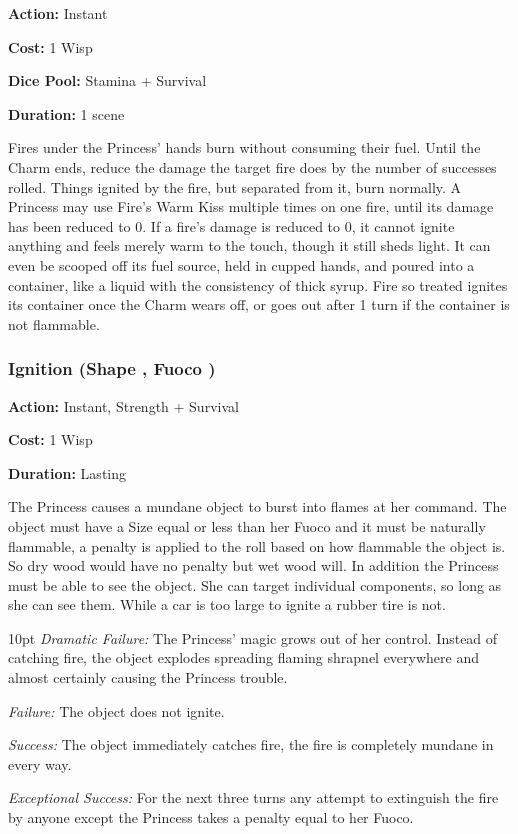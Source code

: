 \noindent \textbf{Action:} Instant

\noindent \textbf{Cost:} 1 Wisp

\noindent \textbf{Dice Pool:} Stamina + Survival

\noindent \textbf{Duration:} 1 scene

Fires under the Princess' hands burn without consuming their fuel. Until the Charm ends, reduce the damage the target fire does by the number of successes rolled. Things ignited by the fire, but separated from it, burn normally. A Princess may use Fire's Warm Kiss multiple times on one fire, until its damage has been reduced to 0. If a fire's damage is reduced to 0, it cannot ignite anything and feels merely warm to the touch, though it still sheds light. It can even be scooped off its fuel source, held in cupped hands, and poured into a container, like a liquid with the consistency of thick syrup. Fire so treated ignites its container once the Charm wears off, or goes out after 1 turn if the container is not flammable.

\subsubsection*{Ignition (Shape \textbullet, Fuoco \textbullet)}

\noindent \textbf{Action:} Instant, Strength + Survival

\noindent \textbf{Cost:} 1 Wisp

\noindent \textbf{Duration:} Lasting

The Princess causes a mundane object to burst into flames at her command. The object must have a Size equal or less than her Fuoco and it must be naturally flammable, a penalty is applied to the roll based on how flammable the object is. So dry wood would have no penalty but wet wood will. In addition the Princess must be able to see the object. She can target individual components, so long as she can see them. While a car is too large to ignite a rubber tire is not.  

\begin{myindentpar}{10pt}    \emph{Dramatic Failure:} The Princess' magic grows out of her control. Instead of catching fire, the object explodes spreading flaming shrapnel everywhere and almost certainly causing the Princess trouble. 

    \emph{Failure:} The object does not ignite. 

    \emph{Success:} The object immediately catches fire, the fire is completely mundane in every way. 

    \emph{Exceptional Success:} For the next three turns any attempt to extinguish the fire by anyone except the Princess takes a penalty equal to her Fuoco.\end{myindentpar}


